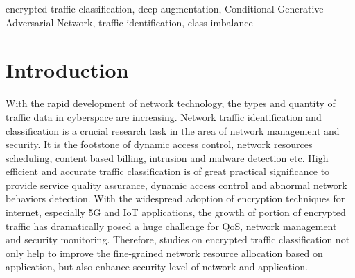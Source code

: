 \documentclass[conference]{IEEEtran}
\begin{document}
\begin{IEEEkeywords}
encrypted traffic classification, deep augmentation, Conditional Generative Adversarial Network, traffic identification, class imbalance
\end{IEEEkeywords}


\section{Introduction}\label{sec:intro} %
With the rapid development of network technology, the types and quantity of traffic data in cyberspace are increasing. Network traffic identification and classification is a crucial research task in the area of network management and security. It is the footstone of dynamic access control, network resources scheduling, content based billing, intrusion and malware detection etc. High efficient and accurate traffic classification is of great practical significance to provide service quality assurance, dynamic access control and abnormal network behaviors detection. With the widespread adoption of encryption techniques for internet, especially 5G and IoT applications, the growth of portion of encrypted traffic has dramatically posed a huge challenge for QoS, network management and security monitoring. Therefore, studies on encrypted traffic classification not only help to improve the fine-grained network resource allocation based on application, but also enhance security level of network and application.
\end{document}
